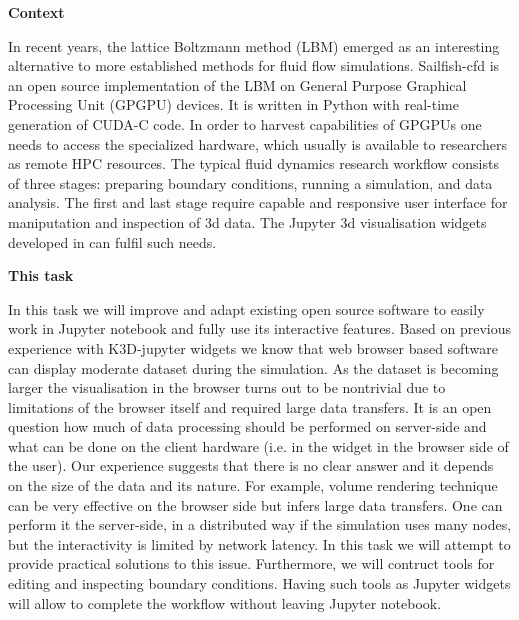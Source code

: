 \begin{task}[
  title=Application: Visualisation and control of fluid dynamics in Jupyter notebook,
  id=application-gpu,
  lead=SIL,
  PM=13,
  wphases={4-36},
  partners={EGI}
]

\textbf{Context}

In recent years, the lattice Boltzmann method (LBM) emerged as an
interesting alternative to more established methods for fluid flow
simulations. Sailfish-cfd \cite{januszewski2014sailfish} is an open
source implementation of the LBM on General Purpose Graphical Processing
Unit (GPGPU) devices. It is written in Python with real-time
generation of CUDA-C code.  In order to harvest capabilities of GPGPUs
one needs to access the specialized hardware, which usually is
available to researchers as remote HPC resources.  The typical fluid
dynamics research workflow consists of three stages: preparing
boundary conditions, running a simulation, and data analysis. The
first and last stage require capable and responsive user interface for
maniputation and inspection of 3d data.  The Jupyter 3d visualisation
widgets developed in  can fulfil
such needs.

\textbf{This task}

In this task we will improve and adapt existing open source software to
easily work in Jupyter notebook and fully use its interactive
features. Based on previous experience with K3D-jupyter\cite{K3D}
widgets we know that web browser based software can display moderate
dataset during the simulation. As the dataset is becoming larger the
visualisation in the browser turns out to be nontrivial due to
limitations of the browser itself and required large data transfers. It is
an open question how much of data processing should be performed on
server-side and what can be done on the client hardware (i.e. in the
widget in the browser side of the user). Our
experience suggests that there is no clear answer and it depends on
the size of the data and its nature. For example, volume rendering
technique can be very effective on the browser side but infers large data
transfers. One can perform it the server-side, in a distributed way if
the simulation uses many nodes, but the interactivity is limited by
network latency. In this task we will attempt to provide practical
solutions to this issue.  Furthermore, we will contruct tools for
editing and inspecting boundary conditions. Having such tools as
Jupyter widgets will allow to complete the workflow without leaving
Jupyter notebook.


\end{task}

